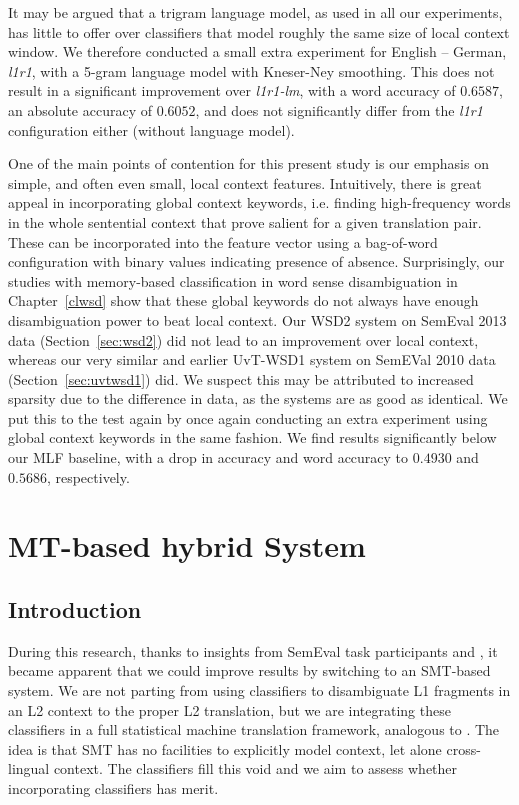 It may be argued that a trigram language model, as used in all our experiments,
has little to offer over classifiers that model roughly the same size of local
context window. We therefore conducted a small extra experiment for English --
German, \emph{l1r1}, with a 5-gram language model with Kneser-Ney smoothing. This does
not result in a significant improvement over \emph{l1r1-lm}, with a word accuracy of
$0.6587$, an absolute accuracy of $0.6052$, and does not significantly differ
from the \emph{l1r1} configuration either (without language model).  %

One of the main points of contention for this present study is our emphasis on
simple, and often even small, local context features. Intuitively, there is
great appeal in incorporating global context keywords, i.e. finding
high-frequency words in the whole sentential context that prove salient for a
given translation pair. These can be incorporated into the feature vector using
a bag-of-word configuration with binary values indicating presence of absence.
Surprisingly, our studies with memory-based classification in word sense
disambiguation in Chapter~\ref{clwsd} show that these global keywords do not
always have enough disambiguation power to beat local context. Our WSD2 system
on SemEval 2013 data (Section~\ref{sec:wsd2}) did not lead to an improvement
over local context, whereas our very similar and earlier UvT-WSD1 system on
SemEVal 2010 data (Section~\ref{sec:uvtwsd1}) did. We suspect this may be
attributed to increased sparsity due to the difference in data, as the systems
are as good as identical. We put this to the test again by once again
conducting an extra experiment using global context keywords in the same
fashion\cite{NgL96}. We find results significantly below our MLF baseline, with
a drop in accuracy and word accuracy to $0.4930$ and $0.5686$, respectively.

\section{MT-based hybrid System}
\label{sec:mtbased}

\subsection{Introduction}

During this research, thanks to insights from SemEval task
participants \cite{UEDIN} and \cite{CNRC}, it became apparent that we
could improve results by switching to an SMT-based system. We are not
parting from using classifiers to disambiguate L1 fragments in an L2
context to the proper L2 translation, but we are integrating these
classifiers in a full statistical machine translation framework,
analogous to \cite{Haque+11}. The idea is that SMT has no facilities to
explicitly model context, let alone cross-lingual context. The classifiers fill
this void and we aim to assess whether incorporating classifiers has merit.

